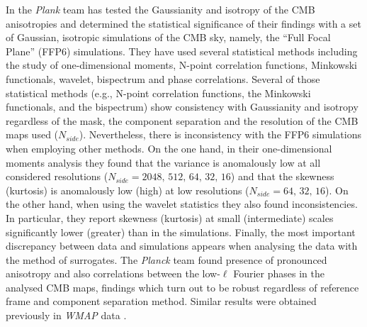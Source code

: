 In \cite{PlanckXXIII} the \textit{Plank} team has tested the Gaussianity and isotropy of  the CMB anisotropies and determined the statistical significance of their findings with a set of Gaussian, isotropic simulations of the CMB sky, namely, the ``Full Focal Plane'' (FFP6) simulations. They have used several statistical methods including the study of one-dimensional moments, N-point correlation functions, Minkowski functionals, wavelet, bispectrum and phase correlations. Several of those statistical methods (e.g., N-point correlation functions, the Minkowski functionals, and the bispectrum) show consistency with Gaussianity and isotropy regardless of the mask, the component separation and the resolution of the CMB maps used ($N_{side}$). Nevertheless, there is inconsistency with the FFP6 simulations when employing other methods. On the one hand, in their one-dimensional moments analysis they found that the variance is anomalously low at all considered resolutions ($N_{side}=2048,\, 512,\, 64,\, 32,\, 16$) and that the skewness (kurtosis) is anomalously low (high) at low resolutions ($N_{side}=64,\,32,\,16$). On the other hand, when using the wavelet statistics they also found inconsistencies. In particular, they report skewness (kurtosis) at small (intermediate) scales significantly lower (greater) than in the simulations. Finally, the most important discrepancy between data and simulations appears when analysing the data with the method of surrogates. The \textit{Planck} team found presence of pronounced anisotropy and also correlations between the low-$\ell$ Fourier phases in the analysed CMB maps, findings which turn out to be robust regardless of reference frame and component separation method. Similar results were obtained previously in \textit{WMAP} data \cite{Rath2009}. 

